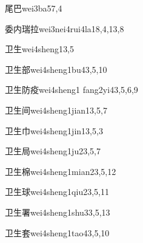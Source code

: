 \begin{entry}{尾巴}{wei3ba5}{7,4}
\end{entry}

\begin{entry}{委内瑞拉}{wei3nei4rui4la1}{8,4,13,8}
\end{entry}

\begin{entry}{卫生}{wei4sheng1}{3,5}
\end{entry}

\begin{entry}{卫生部}{wei4sheng1bu4}{3,5,10}
\end{entry}

\begin{entry}{卫生防疫}{wei4sheng1 fang2yi4}{3,5,6,9}
\end{entry}

\begin{entry}{卫生间}{wei4sheng1jian1}{3,5,7}
\end{entry}

\begin{entry}{卫生巾}{wei4sheng1jin1}{3,5,3}
\end{entry}

\begin{entry}{卫生局}{wei4sheng1ju2}{3,5,7}
\end{entry}

\begin{entry}{卫生棉}{wei4sheng1mian2}{3,5,12}
\end{entry}

\begin{entry}{卫生球}{wei4sheng1qiu2}{3,5,11}
\end{entry}

\begin{entry}{卫生署}{wei4sheng1shu3}{3,5,13}
\end{entry}

\begin{entry}{卫生套}{wei4sheng1tao4}{3,5,10}
\end{entry}

